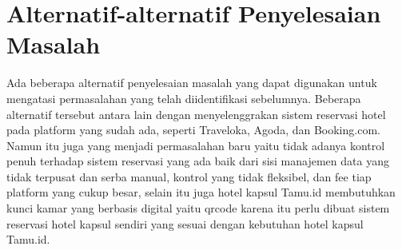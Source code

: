 \section{Alternatif-alternatif Penyelesaian Masalah}

Ada beberapa alternatif penyelesaian masalah yang dapat digunakan untuk mengatasi permasalahan yang telah diidentifikasi sebelumnya. Beberapa alternatif tersebut antara lain dengan menyelenggrakan sistem reservasi hotel pada platform yang sudah ada, seperti Traveloka, Agoda, dan Booking.com. Namun itu juga yang menjadi permasalahan baru yaitu tidak adanya kontrol penuh terhadap sistem reservasi yang ada baik dari sisi manajemen data yang tidak terpusat dan serba manual, kontrol yang tidak fleksibel, dan fee tiap platform yang cukup besar, selain itu juga hotel kapsul Tamu.id membutuhkan kunci kamar yang berbasis digital yaitu qrcode karena itu perlu dibuat sistem reservasi hotel kapsul sendiri yang sesuai dengan kebutuhan hotel kapsul Tamu.id.